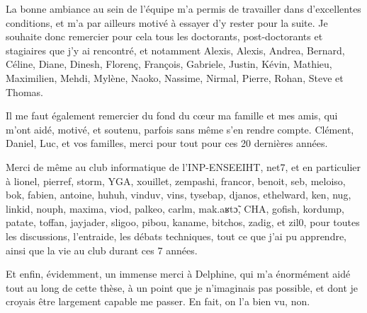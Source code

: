 La bonne ambiance au sein de l'équipe m'a permis de travailler dans d'excellentes conditions, et m'a par ailleurs
motivé à essayer d'y rester pour la suite. Je souhaite donc remercier pour cela tous les doctorants, post-doctorants
et stagiaires que j'y ai rencontré, et notamment Alexis, Alexis, Andrea, Bernard, Céline, Diane, Dinesh, Florenç,
François, Gabriele, Justin, Kévin, Mathieu, Maximilien, Mehdi, Mylène, Naoko, Nassime, Nirmal, Pierre, Rohan, Steve et
Thomas.

Il me faut également remercier du fond du cœur ma famille et mes amis, qui m'ont aidé, motivé, et soutenu, parfois sans
même s'en rendre compte. Clément, Daniel, Luc, et vos familles, merci pour tout pour ces 20 dernières années.

Merci de même au club informatique de l'INP-ENSEEIHT, net7, et en particulier à lionel, pierref, storm, YGA, xouillet,
zempashi, francor, benoit, seb, meloiso, bok, fabien, antoine, huhuh, vinduv, vins, tysebap, djanos, ethelward, ken,
nug, linkid, nouph, maxima, viod, palkeo, carlm, mak.aʁtɔ̃, CHA, gofish, kordump, patate, toffan, jayjader, sligoo,
pibou, kaname, bitchos, zadig, et zil0, pour toutes les discussions, l'entraide, les débats techniques, tout ce que
j'ai pu apprendre, ainsi que la vie au club durant ces 7 années.

Et enfin, évidemment, un immense merci à Delphine, qui m'a énormément aidé tout au long de cette thèse, à un point que
je n'imaginais pas possible, et dont je croyais être largement capable me passer. En fait, on l'a bien vu, non.
